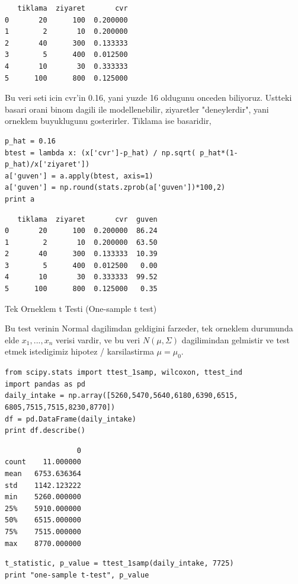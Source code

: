 \documentclass[12pt,fleqn]{article}\usepackage{../common}
\begin{document}
\begin{verbatim}
   tiklama  ziyaret       cvr
0       20      100  0.200000
1        2       10  0.200000
2       40      300  0.133333
3        5      400  0.012500
4       10       30  0.333333
5      100      800  0.125000
\end{verbatim}

Bu veri seti icin cvr'in 0.16, yani yuzde 16 oldugunu onceden
biliyoruz. Ustteki basari orani binom dagili ile modellenebilir, ziyaretler
"deneylerdir", yani orneklem buyuklugunu gosterirler. Tiklama ise
basaridir,

\begin{verbatim}
p_hat = 0.16
btest = lambda x: (x['cvr']-p_hat) / np.sqrt( p_hat*(1-p_hat)/x['ziyaret'])
a['guven'] = a.apply(btest, axis=1)
a['guven'] = np.round(stats.zprob(a['guven'])*100,2)
print a
\end{verbatim}

\begin{verbatim}
   tiklama  ziyaret       cvr  guven
0       20      100  0.200000  86.24
1        2       10  0.200000  63.50
2       40      300  0.133333  10.39
3        5      400  0.012500   0.00
4       10       30  0.333333  99.52
5      100      800  0.125000   0.35
\end{verbatim}

Tek Orneklem t Testi (One-sample t test)

Bu test verinin Normal dagilimdan geldigini farzeder, tek orneklem
durumunda elde $x_1,...,x_n$ verisi vardir, ve bu veri $N(\mu,\Sigma)$
dagilimindan gelmistir ve test etmek istedigimiz hipotez /
karsilastirma $\mu = \mu_0$. 

\begin{verbatim}
from scipy.stats import ttest_1samp, wilcoxon, ttest_ind
import pandas as pd
daily_intake = np.array([5260,5470,5640,6180,6390,6515, 6805,7515,7515,8230,8770])
df = pd.DataFrame(daily_intake)
print df.describe()
\end{verbatim}

\begin{verbatim}
                 0
count    11.000000
mean   6753.636364
std    1142.123222
min    5260.000000
25%    5910.000000
50%    6515.000000
75%    7515.000000
max    8770.000000
\end{verbatim}

\begin{verbatim}
t_statistic, p_value = ttest_1samp(daily_intake, 7725)
print "one-sample t-test", p_value
\end{verbatim}
\end{document}
